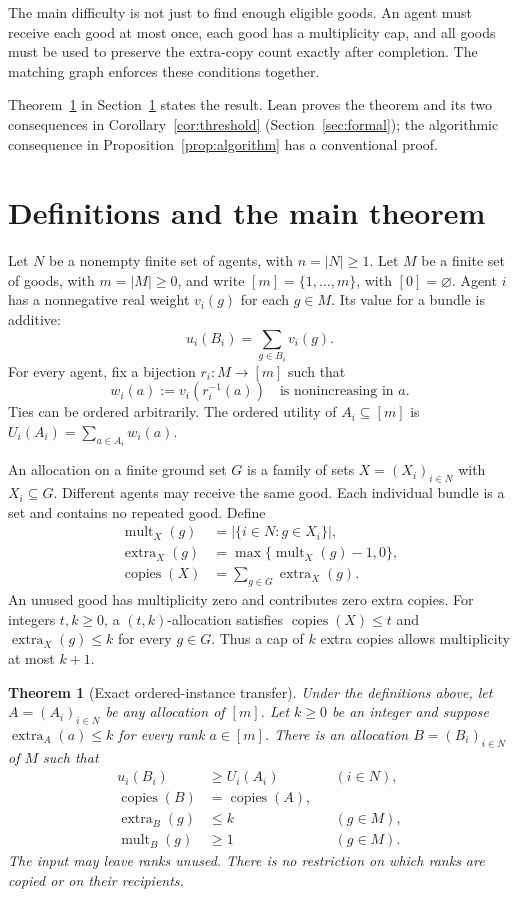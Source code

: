 \documentclass[11pt,a4paper]{article}
\newtheorem{theorem}{Theorem}
\newcommand{\mult}{\operatorname{mult}}
\newcommand{\extra}{\operatorname{extra}}
\newcommand{\copies}{\operatorname{copies}}
\newcommand{\ranks}{[m]}
\begin{document}
The main difficulty is not just to find enough eligible goods. An agent
must receive each good at most once, each good has a multiplicity cap, and
all goods must be used to preserve the extra-copy count exactly after
completion. The matching graph enforces these conditions together.

Theorem~\ref{thm:main} in Section~\ref{sec:main} states the result.
Lean proves the theorem and its two consequences in
Corollary~\ref{cor:threshold} (Section~\ref{sec:formal}); the algorithmic
consequence in Proposition~\ref{prop:algorithm} has a conventional proof.

\section{Definitions and the main theorem}\label{sec:main}
Let $N$ be a nonempty finite set of agents, with $n=|N|\ge1$. Let $M$ be a
finite set of goods, with $m=|M|\ge0$, and write
$\ranks=\{1,\ldots,m\}$, with $[0]=\varnothing$.
Agent $i$ has a nonnegative real weight $v_i(g)$ for each $g\in M$.
Its value for a bundle is additive:
\[
 u_i(B_i)=\sum_{g\in B_i}v_i(g).
\]
For every agent, fix a bijection $r_i:M\to\ranks$ such that
\[
 w_i(a):=v_i(r_i^{-1}(a))
 \quad\text{is nonincreasing in }a.
\]
Ties can be ordered arbitrarily. The ordered utility of $A_i\subseteq\ranks$
is $U_i(A_i)=\sum_{a\in A_i}w_i(a)$.

An allocation on a finite ground set $G$ is a family of sets
$X=(X_i)_{i\in N}$ with $X_i\subseteq G$. Different agents may receive the
same good. Each individual bundle is a set and contains no repeated good.
Define
\begin{align*}
 \mult_X(g)&=|\{i\in N:g\in X_i\}|,\\
 \extra_X(g)&=\max\{\mult_X(g)-1,0\},\\
 \copies(X)&=\sum_{g\in G}\extra_X(g).
\end{align*}
An unused good has multiplicity zero and contributes zero extra copies.
For integers $t,k\ge0$, a $(t,k)$-allocation satisfies
$\copies(X)\le t$ and $\extra_X(g)\le k$ for every $g\in G$.
Thus a cap of $k$ extra copies allows multiplicity at most $k+1$.

\begin{theorem}[Exact ordered-instance transfer]\label{thm:main}
Under the definitions above, let $A=(A_i)_{i\in N}$ be any allocation of
$\ranks$. Let $k\ge0$ be an integer and suppose
$\extra_A(a)\le k$ for every rank $a\in\ranks$.
There is an allocation $B=(B_i)_{i\in N}$ of $M$ such that
\begin{align}
 u_i(B_i)&\ge U_i(A_i) &&(i\in N),\label{eq:utility}\\
 \copies(B)&=\copies(A),\label{eq:copies}\\
 \extra_B(g)&\le k &&(g\in M),\label{eq:cap}\\
 \mult_B(g)&\ge1 &&(g\in M).\label{eq:cover}
\end{align}
The input may leave ranks unused. There is no restriction on which ranks
are copied or on their recipients.
\end{theorem}
\end{document}
